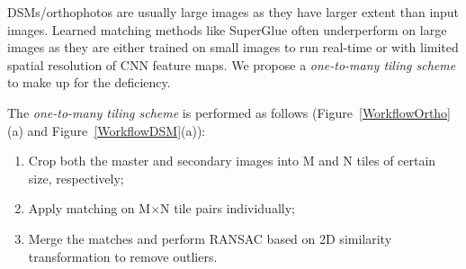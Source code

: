 DSMs/orthophotos are usually large images as they have larger extent than input images.
Learned matching methods like SuperGlue often underperform on large images as they are either trained on small images to run real-time or with limited spatial resolution of CNN feature maps. We propose a \textit{one-to-many tiling scheme} to make up for the deficiency. 
\par
The \textit{one-to-many tiling scheme} is performed as follows (Figure~\ref{WorkflowOrtho}(a) and Figure~\ref{WorkflowDSM}(a)):\\
\begin{enumerate}
    \item Crop both the master and secondary images into M and N tiles of certain size, respectively;
    \item Apply matching on M$\times$N tile pairs individually;
    \item Merge the matches and perform RANSAC based on 2D similarity transformation to remove outliers.
\end{enumerate}

